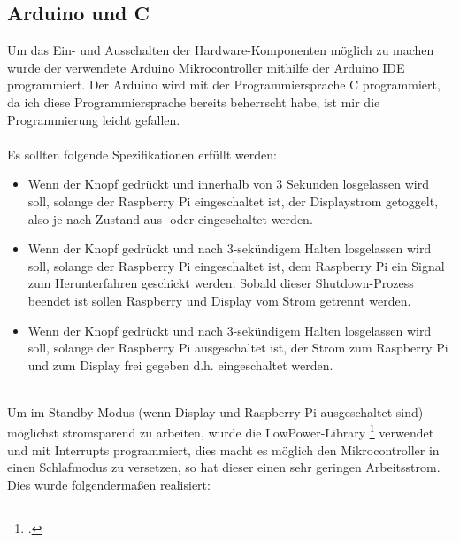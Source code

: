 \subsection{Arduino und C}

Um das Ein- und Ausschalten der Hardware-Komponenten möglich zu machen wurde der verwendete Arduino Mikrocontroller mithilfe der Arduino IDE programmiert. Der Arduino wird mit der Programmiersprache C programmiert, da ich diese Programmiersprache bereits beherrscht habe, ist mir die Programmierung leicht gefallen.\\
\\
Es sollten folgende Spezifikationen erfüllt werden:
\begin{itemize}
	\item Wenn der Knopf gedrückt und innerhalb von 3 Sekunden losgelassen wird soll, solange der Raspberry Pi eingeschaltet ist, der Displaystrom getoggelt, also je nach Zustand aus- oder eingeschaltet werden.
	\item Wenn der Knopf gedrückt und nach 3-sekündigem Halten losgelassen wird soll, solange der Raspberry Pi eingeschaltet ist, dem Raspberry Pi ein Signal zum Herunterfahren geschickt werden. Sobald dieser Shutdown-Prozess beendet ist sollen Raspberry und Display vom Strom getrennt werden.
	\item Wenn der Knopf gedrückt und nach 3-sekündigem Halten losgelassen wird soll, solange der Raspberry Pi ausgeschaltet ist, der Strom zum Raspberry Pi und zum Display frei gegeben d.h. eingeschaltet werden.
\end{itemize}
\ \\
Um im Standby-Modus (wenn Display und Raspberry Pi ausgeschaltet sind) möglichst stromsparend zu arbeiten, wurde die LowPower-Library \footcite{lowpower_lib} verwendet und mit Interrupts programmiert, dies macht es möglich den Mikrocontroller in einen Schlafmodus zu versetzen, so hat dieser einen sehr geringen Arbeitsstrom.
\\
Dies wurde folgendermaßen realisiert:
